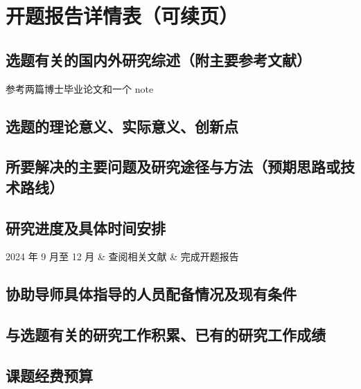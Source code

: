 \documentclass{fdu-proposal}
\begin{document}
\setcounter{chapter}{2}
\chapter{开题报告详情表（可续页）}

\section{选题有关的国内外研究综述（附主要参考文献）}
参考两篇博士毕业论文和一个 note

\section{选题的理论意义、实际意义、创新点}

\section{所要解决的主要问题及研究途径与方法（预期思路或技术路线）}

\section{研究进度及具体时间安排}

\begin{schedule}
  2024 年 9 月至 12 月 & 查阅相关文献 & 完成开题报告
\end{schedule}


\section{协助导师具体指导的人员配备情况及现有条件}

\section{与选题有关的研究工作积累、已有的研究工作成绩}

\section{课题经费预算}
\end{document}

